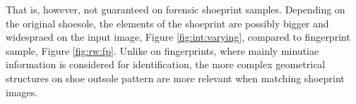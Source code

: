 \documentclass[draft,final]{vutinfth} %
\begin{document}
That is, however, not guaranteed on forensic shoeprint samples.
Depending on the original shoesole, the elements of the shoeprint are possibly bigger and widespraed on the input image, Figure  \ref{fig:int:varying}, compared to  fingerprint sample, Figure \ref{fig:rw:fp}.
Unlike on fingerprints, where mainly minutiae information is considered for identification, the more complex geometrical structures on shoe outsole pattern are more relevant when matching shoeprint images.


\end{document}
